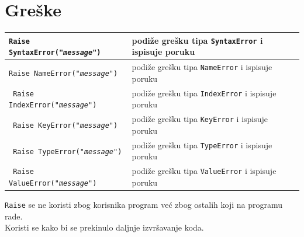\documentclass[10pt]{article}
\begin{document}
    \section*{\color{NavyBlue} Greške}
    \begin{tabular}{|>{\tt}p{9.00cm}|>{}p{15.50cm}|}
        \hline
        Raise SyntaxError("\textit{message}") & podiže grešku tipa \texttt{SyntaxError} i ispisuje poruku
        \\ \hline
        Raise NameError("\textit{message}") & podiže grešku tipa \texttt{NameError} i ispisuje poruku
        \\ \hline
        Raise IndexError("\textit{message}") & podiže grešku tipa \texttt{IndexError} i ispisuje poruku
        \\ \hline
        Raise KeyError("\textit{message}") & podiže grešku tipa \texttt{KeyError} i ispisuje poruku
        \\ \hline
        Raise TypeError("\textit{message}") & podiže grešku tipa \texttt{TypeError} i ispisuje poruku
        \\ \hline
        Raise ValueError("\textit{message}") & podiže grešku tipa \texttt{ValueError} i ispisuje poruku
        \\ \hline
    \end{tabular}
    \begin{center}
        \texttt{Raise} se ne koristi zbog korisnika program već zbog ostalih koji na programu rade. \\
        Koristi se kako bi se prekinulo daljnje izvršavanje koda.
    \end{center}
\end{document}
